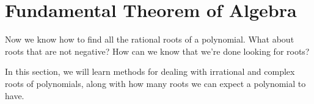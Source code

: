 \section{Fundamental Theorem of Algebra} 
Now we know how to find all the rational roots of a polynomial. What about roots that are not negative? How can we know that we're done looking for roots?

In this section, we will learn methods for dealing with irrational and complex roots of polynomials, along with how many roots we can expect a polynomial to have.



 
 


